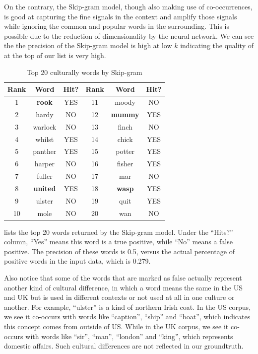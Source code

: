 On the contrary, the Skip-gram model, though also making use of co-occurrences,
is good at capturing the fine signals in the context and amplify those signals
while ignoring the common and popular words in the surrounding. This is
possible due to the reduction of dimensionality by the neural network. We can
see the the precision of the Skip-gram model is high at low $k$ indicating
the quality of at the top of our list is very high.

\begin{table}
\small
\begin{tabular}{|c|c|c|c|c|c|}
\hline
Rank & Word & Hit? & Rank & Word & Hit?\\ \hline
\hline
1 & \bf{rook} & YES & 11 & moody & NO \\
\hline
2 & hardy & NO & 12 & {\bf mummy} & YES \\
\hline
3 & warlock & NO & 13 & finch & NO \\
\hline
4 & whilst & YES & 14 & chick & YES \\
\hline
5 & panther & YES & 15 & potter & YES \\
\hline
6 & harper & NO & 16 & fisher & YES \\
\hline
7 & fuller & NO & 17 & mar & NO \\
\hline
8 & \bf{united} & YES & 18 & \bf{wasp} & YES \\
\hline
9 & ulster & NO & 19 & quit & YES \\
\hline
10 & mole & NO & 20 & wan & NO \\
\hline
\end{tabular}
\caption{Top 20 culturally words by Skip-gram}
\label{tab:top20}
\end{table}

 lists the top 20 words returned by the Skip-gram model.
Under the ``Hits?'' column, ``Yes'' means this word is a true positive, while
``No'' means a false positive. The precision of these words is 0.5,
versus the actual percentage of positive
words in the input data, which is 0.279.

Also notice that some of the words
that are marked as false actually represent another kind of cultural
difference, in which a word means the same in the US and UK but is used in
different contexts or not used at all in one culture or another.
For example, ``ulster'' is a kind of northern Irish coat. In the US
corpus, we see it co-occurs with words like ``caption'', ``ship'' and
``boat'', which indicates this concept comes from outside of US.
While in the UK corpus, we see it co-occurs with words like ``sir'',
``man'', ``london'' and ``king'', which represents domestic affairs.
Such cultural differences are not reflected in our groundtruth.

